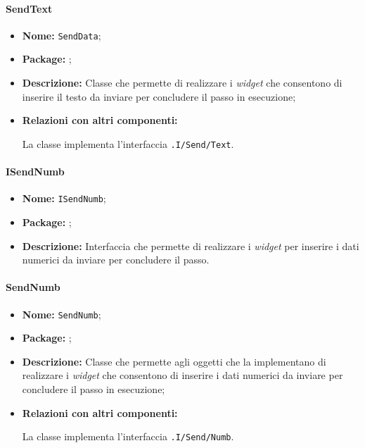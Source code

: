 \paragraph{SendText}
\begin{flushleft}
\begin{itemize}
\item \textbf{Nome:} \texttt{SendData};
\item \textbf{Package:} \texttt{\viewUser{}};
\item \textbf{Descrizione:} Classe che permette di realizzare i \textit{widget} che consentono di inserire il testo da inviare per concludere il passo in esecuzione;
\item \textbf{Relazioni con altri componenti:}
\begin{sloppypar}
La classe implementa l'interfaccia \texttt{\viewUser{}.I\fshyp{}Send\fshyp{}Text}.
\end{sloppypar}
\end{itemize}
\end{flushleft}

\paragraph{ISendNumb}
\begin{itemize}
\item \textbf{Nome:} \texttt{ISendNumb};
\item \textbf{Package:} \texttt{\viewUser{}};
\item \textbf{Descrizione:} Interfaccia che permette di realizzare i \textit{widget} per inserire i dati numerici da inviare per concludere il passo.
\end{itemize}

\paragraph{SendNumb}
\begin{flushleft}
\begin{itemize}
\item \textbf{Nome:} \texttt{SendNumb};
\item \textbf{Package:} \texttt{\viewUser{}};
\item \textbf{Descrizione:} Classe che permette agli oggetti che la implementano di realizzare i \textit{widget} che consentono di inserire i dati numerici da inviare per concludere il passo in esecuzione;
\item \textbf{Relazioni con altri componenti:}
\begin{sloppypar}
La classe implementa l'interfaccia \texttt{\viewUser{}.I\fshyp{}Send\fshyp{}Numb}.
\end{sloppypar}
\end{itemize}
\end{flushleft}

